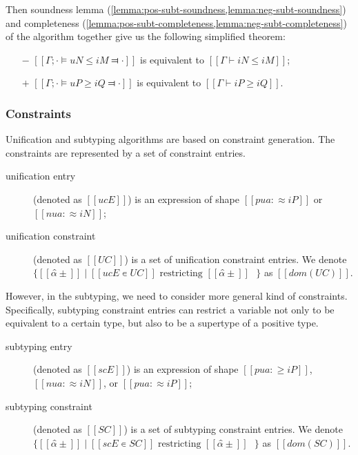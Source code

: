 Then soundness lemma (\cref{lemma:pos-subt-soundness,lemma:neg-subt-soundness}) 
and completeness (\cref{lemma:pos-subt-completeness,lemma:neg-subt-completeness})
of the algorithm together give us the following simplified theorem:

\begin{theorempreview}
  \hfill
  \begin{itemize}
    \item [$-$]  $[[ Γ ; · ⊨ uN ≤ iM ⫤ · ]]$ is equivalent to $[[ Γ ⊢ iN ≤ iM ]]$;
    \item [$+$] $[[ Γ ; · ⊨ uP ≥ iQ ⫤ · ]]$ is equivalent to $[[ Γ ⊢ iP ≥ iQ ]]$.
  \end{itemize}
\end{theorempreview}

\subsubsection{Constraints}
\label{sec:a:constraint-merge}

Unification and subtyping algorithms are based on constraint generation.
The constraints are represented by a set of constraint entries.

\begin{definition}
  \hfill
  \begin{description}
    \item[unification entry] (denoted as $[[ucE]]$) is an expression of shape 
      $[[pua :≈ iP]]$ or $[[nua :≈ iN]]$;
    \item[unification constraint] (denoted as $[[UC]]$) is a set of 
      unification constraint entries.
      We denote $\{[[α̂±]] \mid [[ucE ∊ UC]] \text{ restricting $[[α̂±]]$ }\}$ 
      as $[[dom(UC)]]$.
  \end{description}
\end{definition}

However, in the subtyping, we need to consider more general
kind of constraints. Specifically,
subtyping constraint entries can restrict a variable
not only to be equivalent to a certain type, but
also to be a supertype of a positive type.

\begin{definition}
  \hfill
  \begin{description}
    \item[subtyping entry] (denoted as $[[scE]]$) is an expression of shape 
      $[[pua :≥ iP]]$, $[[nua :≈ iN]]$, or $[[pua :≈ iP]]$;
    \item[subtyping constraint] (denoted as $[[SC]]$) is a set of subtyping constraint entries.
      We denote $\{[[α̂±]] \mid [[scE ∊ SC]] \text{ restricting $[[α̂±]]$ }\}$ 
      as $[[dom(SC)]]$.
  \end{description}
\end{definition}

